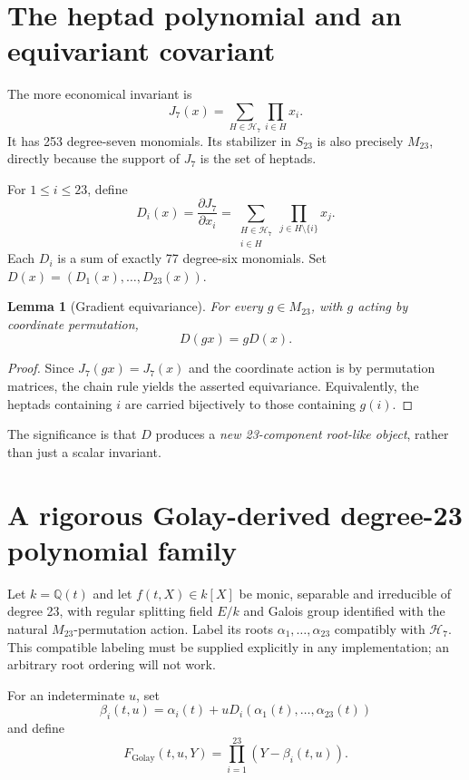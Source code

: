 \documentclass[11pt,letterpaper]{article}
\newtheorem{lemma}[theorem]{Lemma}
\theoremstyle{definition}
\newcommand{\QQ}{\mathbb{Q}}
\newcommand{\oct}{\mathcal{H}_7}
\begin{document}
\section{The heptad polynomial and an equivariant covariant}
The more economical invariant is
\begin{equation}\label{eq:J7}
\boxed{\displaystyle J_7(x)=\sum_{H\in\oct}\prod_{i\in H}x_i.}
\end{equation}
It has 253 degree-seven monomials. Its stabilizer in \(S_{23}\) is also precisely \(M_{23}\), directly because the support of \(J_7\) is the set of heptads.

For \(1\le i\le23\), define
\begin{equation}\label{eq:D}
D_i(x)=\frac{\partial J_7}{\partial x_i}
=\sum_{\substack{H\in\oct\\i\in H}}\prod_{j\in H\setminus\{i\}}x_j.
\end{equation}
Each \(D_i\) is a sum of exactly 77 degree-six monomials. Set \(D(x)=(D_1(x),\ldots,D_{23}(x))\).

\begin{lemma}[Gradient equivariance]\label{lem:equiv}
For every \(g\in M_{23}\), with \(g\) acting by coordinate permutation,
\[
D(gx)=gD(x).
\]
\end{lemma}
\begin{proof}
Since \(J_7(gx)=J_7(x)\) and the coordinate action is by permutation matrices, the chain rule yields the asserted equivariance. Equivalently, the heptads containing \(i\) are carried bijectively to those containing \(g(i)\).
\end{proof}
The significance is that \(D\) produces a \emph{new 23-component root-like object}, rather than just a scalar invariant.

\section{A rigorous Golay-derived degree-23 polynomial family}
Let \(k=\QQ(t)\) and let \(f(t,X)\in k[X]\) be monic, separable and irreducible of degree 23, with regular splitting field \(E/k\) and Galois group identified with the natural \(M_{23}\)-permutation action. Label its roots \(\alpha_1,\ldots,\alpha_{23}\) compatibly with \(\oct\). This compatible labeling must be supplied explicitly in any implementation; an arbitrary root ordering will not work.

For an indeterminate \(u\), set
\begin{equation}\label{eq:beta}
\beta_i(t,u)=\alpha_i(t)+uD_i(\alpha_1(t),\ldots,\alpha_{23}(t))
\end{equation}
and define
\begin{equation}\label{eq:newpoly}
\boxed{\displaystyle F_{\mathrm{Golay}}(t,u,Y)=\prod_{i=1}^{23}(Y-\beta_i(t,u)).}
\end{equation}
\end{document}
